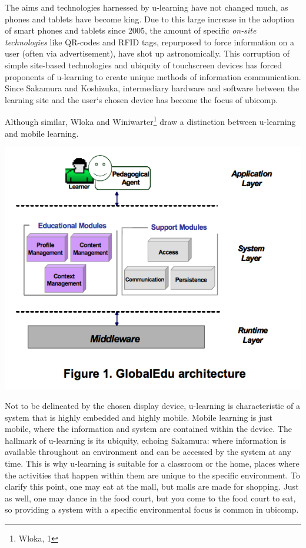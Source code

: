\documentclass[twoside]{article}
\begin{document}
\begin{multicols}{2}
\setlength\parindent{24pt}The aims and technologies harnessed by u-learning have not changed much, as phones and tablets have become king. Due to this large increase in the adoption of smart phones and tablets since 2005, the amount of specific \emph{on-site technologies} like QR-codes and RFID tags, repurposed to force information on a user (often via advertisement), have shot up astronomically. This corruption of simple site-based technologies and ubiquity of touchscreen devices has forced proponents of u-learning to create unique methods of information communication. Since Sakamura and Koshizuka, intermediary hardware and software between the learning site and the user`s chosen device has become the focus of ubicomp.

\setlength\parindent{24pt}Although similar, Wloka and Winiwarter\footnote{Wloka, 1} draw a distinction between u-learning and mobile learning.
\begin{flushleft}
\includegraphics[scale=0.35,left]{1}
\end{flushleft}
Not to be delineated by the chosen display device, u-learning is characteristic of a system that is highly embedded and highly mobile. Mobile learning is just mobile, where the information and system are contained within the device. The hallmark of u-learning is its ubiquity, echoing Sakamura: where information is available throughout an environment and can be accessed by the system at any time. This is why u-learning is suitable for a classroom or the home, places where the activities that happen within them are unique to the specific environment. To clarify this point, one may eat at the mall, but malls are made for shopping. Just as well, one may dance in the food court, but you come to the food court to eat, so providing a system with a specific environmental focus is common in ubicomp.


\end{multicols}
\end{document}
